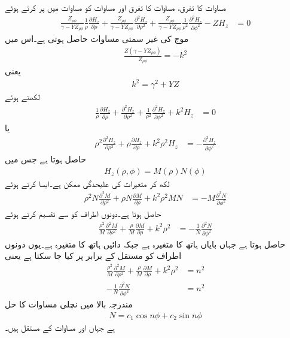 مساوات  کا  تفرق، مساوات  کا  تفرق اور مساوات  کو مساوات  میں پر کرتے ہوئے
\begin{align}
\frac{Z_{\rho \phi}}{\gamma-YZ_{\rho \phi}}\frac{1}{\rho}\frac{\partial H_z}{\partial \rho}+\frac{Z_{\rho \phi}}{\gamma-YZ_{\rho \phi}}\frac{\partial^2 H_z}{\partial \rho^2}+\frac{Z_{\rho \phi}}{\gamma-YZ_{\rho \phi}} \frac{1}{\rho^2}\frac{\partial^2 H_z}{\partial \phi^2} -Z H_{z}&=0
\end{align}
موج کی غیر سمتی مساوات حاصل ہوتی ہے۔اس میں
\begin{align}
\frac{Z\left(\gamma-YZ_{\rho \phi}\right)}{Z_{\rho \phi}}=-k^2
\end{align} 
یعنی
\begin{align}\label{مساوات_مویج_ترسیلی_مستقل_الف}
k^2=\gamma^2+YZ
\end{align}
لکھتے ہوئے
\begin{align*}
\frac{1}{\rho}\frac{\partial H_z}{\partial \rho}+\frac{\partial^2 H_z}{\partial \rho^2}+\frac{1}{\rho^2}\frac{\partial^2 H_z}{\partial \phi^2} +k^2 H_{z}&=0
\end{align*}
یا
\begin{align}
\rho^2 \frac{\partial^2 H_z}{\partial \rho^2}+\rho \frac{\partial H_z}{\partial \rho} +k^2 \rho^2 H_{z}&=-\frac{\partial^2 H_z}{\partial \phi^2}
\end{align}
حاصل ہوتا ہے جس میں
\begin{align}\label{مساوات_مویج_نلکی_علیحدگی_مساوات}
H_z(\rho,\phi) =M(\rho) N(\phi)
\end{align}
لکھ کر متغیرات کی علیحدگی ممکن ہے۔ایسا کرتے ہوئے
\begin{align*}
\rho^2 N\frac{\partial^2 M}{\partial \rho^2} +\rho N \frac{\partial M}{\partial \rho} +k^2 \rho^2 M N&=-M \frac{\partial^2 N}{\partial \phi^2}
\end{align*}
حاصل ہوتا ہے۔دونوں اطراف کو  سے تقسیم کرتے ہوئے
\begin{align*}
\frac{\rho^2}{M} \frac{\partial^2 M}{\partial \rho^2} +\frac{\rho}{M} \frac{\partial M}{\partial \rho} +k^2 \rho^2 &=-\frac{1}{N} \frac{\partial^2 N}{\partial \phi^2}
\end{align*}
حاصل ہوتا ہے جہاں بایاں ہاتھ کا متغیرہ  ہے جبکہ دائیں ہاتھ کا متغیرہ  ہے۔یوں دونوں اطراف کو مستقل  کے برابر پر کیا جا سکتا ہے یعنی
\begin{align}
\frac{\rho^2}{M} \frac{\partial^2 M}{\partial \rho^2} +\frac{\rho}{M} \frac{\partial M}{\partial \rho} +k^2 \rho^2 &=n^2\label{مساوات_مویج_نلکی_علیحدہ_مساوات_الف}\\
-\frac{1}{N} \frac{\partial^2 N}{\partial \phi^2}&=n^2
\end{align}
مندرجہ بالا میں نچلی مساوات کا حل
\begin{align}
N=c_1 \cos n \phi +c_2 \sin n \phi
\end{align}
ہے جہاں  اور  مساوات کے مستقل ہیں۔

